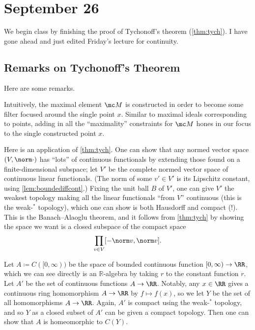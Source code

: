 \documentclass[../notes.tex]{subfiles}
\begin{document}
\section{September 26}

We begin class by finishing the proof of Tychonoff's theorem (\autoref{thm:tych}). I have gone ahead and just edited Friday's lecture for continuity.

\subsection{Remarks on Tychonoff's Theorem}
Here are some remarks.
\begin{remark}
	Intuitively, the maximal element $\mc M$ is constructed in order to become some filter focused around the single point $x$. Similar to maximal ideals corresponding to points, adding in all the ``maximality'' constraints for $\mc M$ hones in our focus to the single constructed point $x$.
\end{remark}
\begin{remark}
	Here is an application of \autoref{thm:tych}. One can show that any normed vector space $(V,\norm\cdot)$ has ``lots'' of continuous functionals by extending those found on a finite-dimensional subspace; let $V'$ be the complete normed vector space of continuous linear functionals. (The norm of some $v'\in V'$ is its Lipschitz constant, using \autoref{lem:boundediffcont}.) Fixing the unit ball $B$ of $V'$, one can give $V'$ the weakest topology making all the linear functionals ``from $V$'' continuous (this is the weak-$^*$ topology), which one can show is both Hausdorff and compact (!). This is the Banach--Alaoglu theorem, and it follows from \autoref{thm:tych} by showing the space we want is a closed subspace of the compact space
	\[\prod_{v\in V}[-\norm v,\norm v].\]
\end{remark}
\begin{remark}
	Let $A\coloneqq C([0,\infty))$ be the space of bounded continuous function $[0,\infty)\to\RR$, which we can see directly is an $\mathbb R$-algebra by taking $r$ to the constant function $r$. Let $A'$ be the set of continuous functions $A\to\RR$. Notably, any $x\in\RR$ gives a continuous ring homomorphism $A\to\RR$ by $f\mapsto f(x)$, so we let $Y$ be the set of all homomorphisms $A\to\RR$. Again, $A'$ is compact using the weak-$^*$ topology, and so $Y$ as a closed subset of $A'$ can be given a compact topology. Then one can show that $A$ is homeomorphic to $C(Y)$.
\end{remark}
\end{document}
